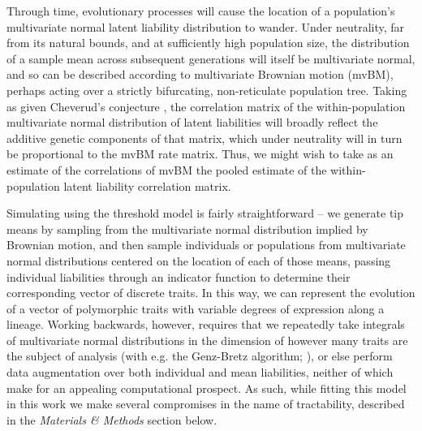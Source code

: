 \documentclass[10pt, twocolumn, twoside]{article}
\begin{document}
Through time, evolutionary processes will cause the location of a population's multivariate normal latent liability distribution to wander. Under neutrality, far from its natural bounds, and at sufficiently high population size, the distribution of a sample mean across subsequent generations will itself be multivariate normal, and so can be described according to multivariate Brownian motion (mvBM), perhaps acting over a strictly bifurcating, non-reticulate population tree. Taking as given Cheverud's conjecture \citep{cheverudDevelopmentalIntegrationEvolution1996, sodiniComparisonGenotypicPhenotypic2018}, the correlation matrix of the within-population multivariate normal distribution of latent liabilities will broadly reflect the additive genetic components of that matrix, which under neutrality will in turn be proportional to the mvBM rate matrix. Thus, we might wish to take as an estimate of the correlations of mvBM the pooled estimate of the within-population latent liability correlation matrix.

Simulating using the threshold model is fairly straightforward – we generate tip means by sampling from the multivariate normal distribution implied by Brownian motion, and then sample individuals or populations from multivariate normal distributions centered on the location of each of those means, passing individual liabilities through an indicator function to determine their corresponding vector of discrete traits. In this way, we can represent the evolution of a vector of polymorphic traits with variable degrees of expression along a lineage. Working backwards, however, requires that we repeatedly take integrals of multivariate normal distributions in the dimension of however many traits are the subject of analysis (with e.g. the Genz-Bretz algorithm; \citealt{genzComparisonMethodsComputation2002}), or else perform data augmentation over both individual and mean liabilities, neither of which make for an appealing computational prospect. As such, while fitting this model in this work we make several compromises in the name of tractability, described in the \textit{Materials \& Methods} section below.  

\end{document}
